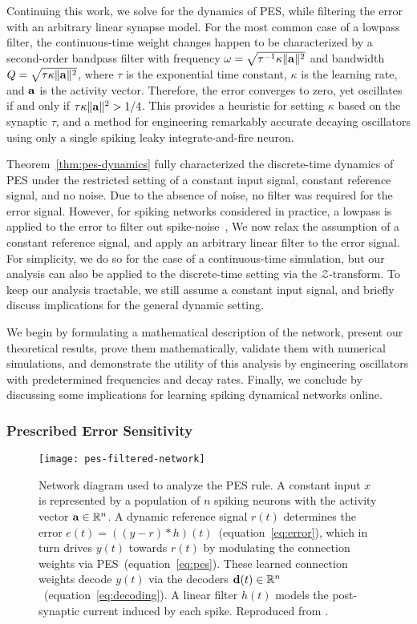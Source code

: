Continuing this work, we solve for the dynamics of PES, while filtering the error with an arbitrary linear synapse model. 
For the most common case of a lowpass filter, the continuous-time weight changes happen to be characterized by a second-order bandpass filter with frequency $\omega = \sqrt{\tau^{-1} \kappa \|\mathbf{a}\|^2 }$ and bandwidth $Q = \sqrt{\tau \kappa \|\mathbf{a}\|^2 }$, where $\tau$ is the exponential time constant, $\kappa$ is the learning rate, and $\mathbf{a}$ is the activity vector.
Therefore, the error converges to zero, yet oscillates if and only if $\tau \kappa \|\mathbf{a}\|^2 > 1/4$.
This provides a heuristic for setting $\kappa$ based on the synaptic $\tau$, and a method for engineering remarkably accurate decaying oscillators using only a single spiking leaky integrate-and-fire neuron.

Theorem~\ref{thm:pes-dynamics} fully characterized the discrete-time dynamics of PES under the restricted setting of a constant input signal, constant reference signal, and no noise.
Due to the absence of noise, no filter was required for the error signal.
However, for spiking networks considered in practice, a lowpass is applied to the error to filter out spike-noise~\citep[e.g.,][]{dewolf2016, rasmussen2017},  
We now relax the assumption of a constant reference signal, and apply an arbitrary linear filter to the error signal.
For simplicity, we do so for the case of a continuous-time simulation, but our analysis can also be applied to the discrete-time setting via the $\mathcal{Z}$-transform.
To keep our analysis tractable, we still assume a constant input signal, and briefly discuss implications for the general dynamic setting.

We begin by formulating a mathematical description of the network, present our theoretical results, prove them mathematically, validate them with numerical simulations, and demonstrate the utility of this analysis by engineering oscillators with predetermined frequencies and decay rates.
Finally, we conclude by discussing some implications for learning spiking dynamical networks online.

\subsubsection{Prescribed Error Sensitivity}

\begin{figure}
\centering
\texttt{[image: pes-filtered-network]}
\caption{\label{fig:pes-filtered-network}
  Network diagram used to analyze the PES rule.
  A constant input $x$ is represented by a population of $n$ spiking neurons with the activity vector $\mathbf{a} \in \mathbb{R}^n$.
  A dynamic reference signal $r(t)$ determines the error $e(t) = \left((y - r) \ast h\right)(t)$~(equation~\ref{eq:error}), which in turn drives $y(t)$ towards $r(t)$ by modulating the connection weights via PES~(equation~\ref{eq:pes}).
  These learned connection weights decode $y(t)$ via the decoders $\mathbf{d}(t) \in \mathbb{R}^n$~(equation~\ref{eq:decoding}).
  A linear filter $h(t)$ models the post-synaptic current induced by each spike.
  Reproduced from \citet[][Figure~1]{voelker2017c}.
}
\end{figure}

